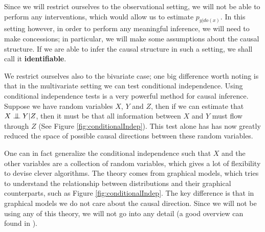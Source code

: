 Since we will restrict ourselves to the observational setting, we will not be able to perform any interventions,
which would allow us to estimate $p_{y|do(x)}$. In this setting however, in order to perform any meaningful
inference, we will need to make concessions; in particular, we will make some assumptions about 
the causal structure. If we are able to infer the causal structure in such a setting, we 
shall call it \textbf{identifiable}.



We restrict ourselves also to the bivariate case; one big difference worth noting is that in the
multivariate setting we can test conditional independence. Using conditional independence tests 
is a very powerful method for causal inference. Suppose 
we have random variables $X$, $Y$ and $Z$, then if we can estimate that $X \bigCI Y | Z$, then it must be 
that all information between $X$ and $Y$ must flow through $Z$ (See Figure \ref{fig:conditionalIndep}).
This test alone has has now greatly reduced the space of possible causal directions between these random variables.

One can in fact generalize the conditional independence such that $X$ and the other variables are 
a collection of random variables, which gives a lot of flexibility to devise clever algorithms. 
The theory comes from graphical models, which tries to understand the relationship between 
distributions and their graphical counterparts, such as Figure \ref{fig:conditionalIndep}.
The key difference is that in graphical models we do not care about the causal direction. 
Since we will not be using any of this theory, we will not go into any detail 
(a good overview can found in \cite{bishop2006pattern}).

